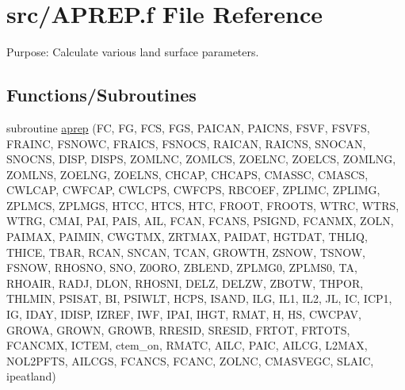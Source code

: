 \hypertarget{APREP_8f}{}\section{src/\+A\+P\+R\+E\+P.f File Reference}
\label{APREP_8f}


Purpose\+: Calculate various land surface parameters.  


\subsection*{Functions/\+Subroutines}
\begin{DoxyCompactItemize}
\item 
subroutine \hyperlink{APREP_8f_a5fe4fa336815bc509d646edae0744405}{aprep} (F\+C, F\+G, F\+C\+S, F\+G\+S, P\+A\+I\+C\+A\+N, P\+A\+I\+C\+N\+S, F\+S\+V\+F, F\+S\+V\+F\+S, F\+R\+A\+I\+N\+C, F\+S\+N\+O\+W\+C, F\+R\+A\+I\+C\+S, F\+S\+N\+O\+C\+S, R\+A\+I\+C\+A\+N, R\+A\+I\+C\+N\+S, S\+N\+O\+C\+A\+N, S\+N\+O\+C\+N\+S, D\+I\+S\+P, D\+I\+S\+P\+S, Z\+O\+M\+L\+N\+C, Z\+O\+M\+L\+C\+S, Z\+O\+E\+L\+N\+C, Z\+O\+E\+L\+C\+S, Z\+O\+M\+L\+N\+G, Z\+O\+M\+L\+N\+S, Z\+O\+E\+L\+N\+G, Z\+O\+E\+L\+N\+S, C\+H\+C\+A\+P, C\+H\+C\+A\+P\+S, C\+M\+A\+S\+S\+C, C\+M\+A\+S\+C\+S, C\+W\+L\+C\+A\+P, C\+W\+F\+C\+A\+P, C\+W\+L\+C\+P\+S, C\+W\+F\+C\+P\+S, R\+B\+C\+O\+E\+F, Z\+P\+L\+I\+M\+C, Z\+P\+L\+I\+M\+G, Z\+P\+L\+M\+C\+S, Z\+P\+L\+M\+G\+S, H\+T\+C\+C, H\+T\+C\+S, H\+T\+C, F\+R\+O\+O\+T, F\+R\+O\+O\+T\+S, W\+T\+R\+C, W\+T\+R\+S, W\+T\+R\+G, C\+M\+A\+I, P\+A\+I, P\+A\+I\+S, A\+I\+L, F\+C\+A\+N, F\+C\+A\+N\+S, P\+S\+I\+G\+N\+D, F\+C\+A\+N\+M\+X, Z\+O\+L\+N, P\+A\+I\+M\+A\+X, P\+A\+I\+M\+I\+N, C\+W\+G\+T\+M\+X, Z\+R\+T\+M\+A\+X, P\+A\+I\+D\+A\+T, H\+G\+T\+D\+A\+T, T\+H\+L\+I\+Q, T\+H\+I\+C\+E, T\+B\+A\+R, R\+C\+A\+N, S\+N\+C\+A\+N, T\+C\+A\+N, G\+R\+O\+W\+T\+H, Z\+S\+N\+O\+W, T\+S\+N\+O\+W, F\+S\+N\+O\+W, R\+H\+O\+S\+N\+O, S\+N\+O, Z0\+O\+R\+O, Z\+B\+L\+E\+N\+D, Z\+P\+L\+M\+G0, Z\+P\+L\+M\+S0, T\+A, R\+H\+O\+A\+I\+R, R\+A\+D\+J, D\+L\+O\+N, R\+H\+O\+S\+N\+I, D\+E\+L\+Z, D\+E\+L\+Z\+W, Z\+B\+O\+T\+W, T\+H\+P\+O\+R, T\+H\+L\+M\+I\+N, P\+S\+I\+S\+A\+T, B\+I, P\+S\+I\+W\+L\+T, H\+C\+P\+S, I\+S\+A\+N\+D, I\+L\+G, I\+L1, I\+L2, J\+L, I\+C, I\+C\+P1, I\+G, I\+D\+A\+Y, I\+D\+I\+S\+P, I\+Z\+R\+E\+F, I\+W\+F, I\+P\+A\+I, I\+H\+G\+T, R\+M\+A\+T, H, H\+S, C\+W\+C\+P\+A\+V, G\+R\+O\+W\+A, G\+R\+O\+W\+N, G\+R\+O\+W\+B, R\+R\+E\+S\+I\+D, S\+R\+E\+S\+I\+D, F\+R\+T\+O\+T, F\+R\+T\+O\+T\+S, F\+C\+A\+N\+C\+M\+X, I\+C\+T\+E\+M, ctem\+\_\+on, R\+M\+A\+T\+C, A\+I\+L\+C, P\+A\+I\+C, A\+I\+L\+C\+G, L2\+M\+A\+X, N\+O\+L2\+P\+F\+T\+S, A\+I\+L\+C\+G\+S, F\+C\+A\+N\+C\+S, F\+C\+A\+N\+C, Z\+O\+L\+N\+C, C\+M\+A\+S\+V\+E\+G\+C, S\+L\+A\+I\+C, ipeatland)

\end{DoxyCompactItemize}
